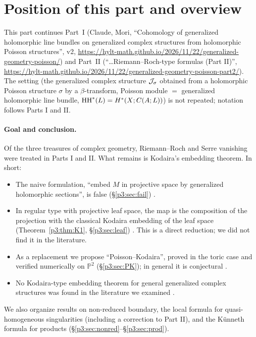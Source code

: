 \section{Position of this part and overview}\label{p3:sec:intro}
This part continues Part~I (Claude, Mori, ``Cohomology of generalized holomorphic line bundles on generalized complex structures from holomorphic Poisson structures'', v2, \url{https://hylt-math.github.io/2026/11/22/generalized-geometry-poisson/}) and Part~II (``\dots Riemann--Roch-type formulas (Part II)'', \url{https://hylt-math.github.io/2026/11/22/generalized-geometry-poisson-part2/}). The setting (the generalized complex structure $\mathcal J_\sigma$ obtained from a holomorphic Poisson structure $\sigma$ by a $\beta$-transform, Poisson module $=$ generalized holomorphic line bundle, $\mathrm{HH}^*(L)=H^*(X;C(A;L))$) is not repeated; notation follows Parts I and II.

\paragraph{Goal and conclusion.}
Of the three treasures of complex geometry, Riemann--Roch and Serre vanishing were treated in Parts I and II. What remains is Kodaira's embedding theorem. In short:
\begin{itemize}
\item The naive formulation, ``embed $M$ in projective space by generalized holomorphic sections'', is false (\S\ref{p3:sec:fail}) \tP.
\item In regular type with projective leaf space, the map is the composition of the projection with the classical Kodaira embedding of the leaf space (Theorem~\ref{p3:thm:K1}, \S\ref{p3:sec:leaf}) \tP. This is a direct reduction; we did not find it in the literature.
\item As a replacement we propose ``Poisson--Kodaira'', proved in the toric case and verified numerically on $\mathbb P^2$ (\S\ref{p3:sec:PK}); in general it is conjectural \tK.
\item No Kodaira-type embedding theorem for general generalized complex structures was found in the literature we examined \tC.
\end{itemize}
We also organize results on non-reduced boundary, the local formula for quasi-homogeneous singularities (including a correction to Part II), and the K\"unneth formula for products (\S\ref{p3:sec:nonred}--\S\ref{p3:sec:prod}).


